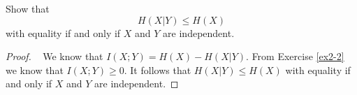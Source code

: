 \begin{exercise}  {Show that $$H(X|Y) \le H(X)$$
  with equality if and only if $X$ and $Y$ are independent. }
\begin{proof}
\par{~}
We know that $I(X;Y) = H(X) - H(X|Y)$. From Exercise \ref{ex2-2} we know that $I(X;Y) \ge 0$. It follows that $H(X|Y) \le H(X)$ with equality if and only if $X$ and $Y$ are independent.
\end{proof}
\end{exercise}
  